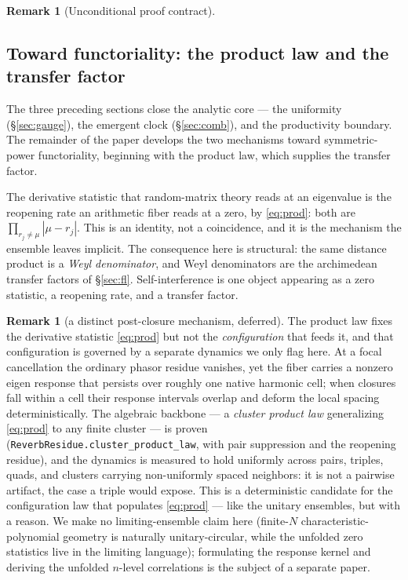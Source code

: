 \documentclass[11pt]{article}
\theoremstyle{definition}
\newtheorem{remark}[theorem]{Remark}
\begin{document}
\begin{remark}[Unconditional proof contract]
\begin{enumerate}
\section{Toward functoriality: the product law and the transfer factor}\label{sec:gue}

The three preceding sections close the analytic core --- the uniformity (\S\ref{sec:gauge}), the
emergent clock (\S\ref{sec:comb}), and the productivity boundary. The remainder of the paper develops
the two mechanisms toward symmetric-power functoriality, beginning with the product law, which supplies
the transfer factor.

The derivative statistic that random-matrix theory reads at an eigenvalue is the reopening rate an
arithmetic fiber reads at a zero, by \eqref{eq:prod}: both are $\prod_{r_j\neq\mu}|\mu-r_j|$. This is
an identity, not a coincidence, and it is the mechanism the ensemble leaves implicit. The consequence
here is structural: the same distance product is a \emph{Weyl denominator}, and Weyl denominators are
the archimedean transfer factors of \S\ref{sec:fl}. Self-interference is one object appearing as a
zero statistic, a reopening rate, and a transfer factor.

\begin{remark}[a distinct post-closure mechanism, deferred]\label{rem:reverb}
The product law fixes the derivative statistic \eqref{eq:prod} but not the \emph{configuration} that
feeds it, and that configuration is governed by a separate dynamics we only flag here. At a focal
cancellation the ordinary phasor residue vanishes, yet the fiber carries a nonzero eigen response that
persists over roughly one native harmonic cell; when closures fall within a cell their response
intervals overlap and deform the local spacing deterministically. The algebraic backbone --- a
\emph{cluster product law} generalizing \eqref{eq:prod} to any finite cluster --- is proven
(\texttt{ReverbResidue.cluster\_product\_law}, with pair suppression and the reopening residue), and
the dynamics is measured to hold uniformly across pairs, triples, quads, and clusters carrying
non-uniformly spaced neighbors: it is not a pairwise artifact, the case a triple would expose. This is
a deterministic candidate for the configuration law that populates \eqref{eq:prod} --- like the
unitary ensembles, but with a reason. We make no limiting-ensemble claim here (finite-$N$
characteristic-polynomial geometry is naturally unitary-circular, while the unfolded zero statistics
live in the limiting language); formulating the response kernel and deriving the unfolded $n$-level
correlations is the subject of a separate paper.
\end{remark}


\end{enumerate}
\end{remark}
\end{document}
